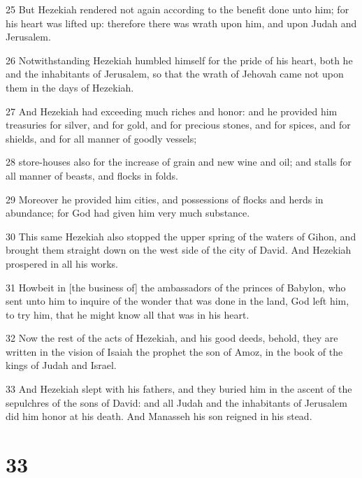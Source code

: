 \par 25 But Hezekiah rendered not again according to the benefit done unto him; for his heart was lifted up: therefore there was wrath upon him, and upon Judah and Jerusalem.
\par 26 Notwithstanding Hezekiah humbled himself for the pride of his heart, both he and the inhabitants of Jerusalem, so that the wrath of Jehovah came not upon them in the days of Hezekiah.
\par 27 And Hezekiah had exceeding much riches and honor: and he provided him treasuries for silver, and for gold, and for precious stones, and for spices, and for shields, and for all manner of goodly vessels;
\par 28 store-houses also for the increase of grain and new wine and oil; and stalls for all manner of beasts, and flocks in folds.
\par 29 Moreover he provided him cities, and possessions of flocks and herds in abundance; for God had given him very much substance.
\par 30 This same Hezekiah also stopped the upper spring of the waters of Gihon, and brought them straight down on the west side of the city of David. And Hezekiah prospered in all his works.
\par 31 Howbeit in [the business of] the ambassadors of the princes of Babylon, who sent unto him to inquire of the wonder that was done in the land, God left him, to try him, that he might know all that was in his heart.
\par 32 Now the rest of the acts of Hezekiah, and his good deeds, behold, they are written in the vision of Isaiah the prophet the son of Amoz, in the book of the kings of Judah and Israel.
\par 33 And Hezekiah slept with his fathers, and they buried him in the ascent of the sepulchres of the sons of David: and all Judah and the inhabitants of Jerusalem did him honor at his death. And Manasseh his son reigned in his stead.

\chapter{33}

